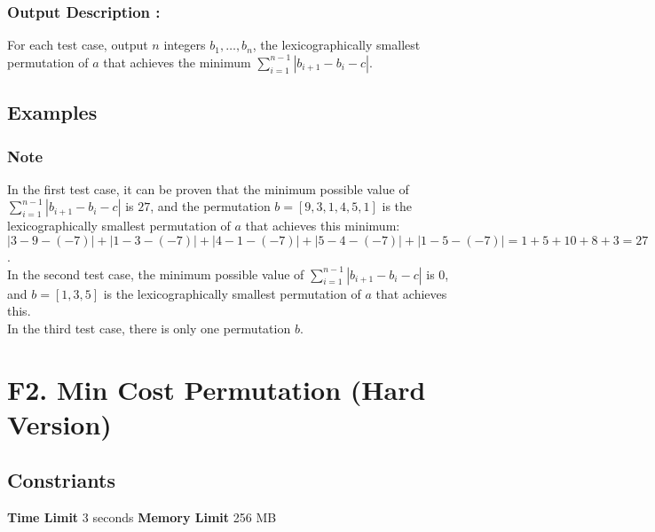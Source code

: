 \documentclass{article}
\begin{document}
\paragraph{}
\subsubsection*{Output Description : }For each test case, output $n$ integers $b_1,\dots,b_n$, the lexicographically smallest permutation of $a$ that achieves the minimum $\sum\limits_{i=1}^{n-1} |b_{i+1}-b_i-c|$.
\subsection*{Examples}
\subsubsection*{Note}In the first test case, it can be proven that the minimum possible value of $\sum\limits_{i=1}^{n-1} |b_{i+1}-b_i-c|$ is $27$, and the permutation $b = [9,3,1,4,5,1]$ is the lexicographically smallest permutation of $a$ that achieves this minimum: $|3-9-(-7)|+|1-3-(-7)|+|4-1-(-7)|+|5-4-(-7)|+|1-5-(-7)| = 1+5+10+8+3 = 27$.\\ In the second test case, the minimum possible value of $\sum\limits_{i=1}^{n-1} |b_{i+1}-b_i-c|$ is $0$, and $b = [1,3,5]$ is the lexicographically smallest permutation of $a$ that achieves this.\\ In the third test case, there is only one permutation $b$.
\newpage
\section*{F2. Min Cost Permutation (Hard Version)}
\subsection*{Constriants}
\textbf{Time Limit}
3 seconds
\hfill
\textbf{Memory Limit}
256 MB
\end{document}

